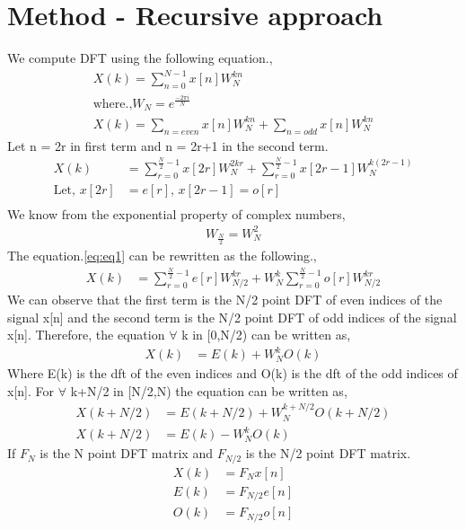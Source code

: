 \documentclass[journal,12pt,twocolumn]{IEEEtran}
\begin{document}
\section{Method - Recursive approach}
We compute DFT using the following equation.,
\begin{align}
    X(k) = \sum_{n=0}^{N-1}x[n]W_{N}^{kn} \label{eq:DFT_equation}\\
    \text{where.,} W_N = e^\frac{-2\pi i}{N}\\
    X(k) = \sum_{n=even}^{}x[n]W_{N}^{kn} + \sum_{n=odd}^{}x[n]W_{N}^{kn}
\end{align}
Let n = 2r in first term and n = 2r+1 in the second term.
\begin{align}
    X(k) &= \sum_{r=0}^{\frac{N}{2}-1}x[2r]W_{N}^{2kr} + \sum_{r=0}^{\frac{N}{2}-1}x[2r-1]W_{N}^{k(2r-1)} \label{eq:eq1}\\
\text{Let, }    x[2r]&=e[r] \text{, }x[2r-1]=o[r]\\
\end{align}
We know from the exponential property of complex numbers,
\begin{align}
    W_\frac{N}{2} = W_{N}^{2}
\end{align}
The equation.\ref{eq:eq1} can be rewritten as the following.,
\begin{align}
    X(k) &= \sum_{r=0}^{\frac{N}{2}-1}e[r]W_{N/2}^{kr} + W_{N}^k\sum_{r=0}^{\frac{N}{2}-1}o[r]W_{N/2}^{kr}
\end{align}
We can observe that the first term is the N/2 point DFT of even indices of the signal x[n] and the second term is the N/2 point DFT of odd indices of the signal x[n].
Therefore, the equation $\forall$ k in [0,N/2) can be written as, 
\begin{align}
    X(k) &= E(k) + W_{N}^k O(k)  \label{eq:eq2}
\end{align}
Where E(k) is the dft of the even indices and O(k) is the dft of the odd indices of x[n].
For $\forall$ k+N/2 in [N/2,N) the equation can be written as,
\begin{align}
    X(k+N/2) &= E(k+N/2) + W_{N}^{k+N/2} O(k+N/2)\\
    X(k+N/2) &= E(k) - W_N^k O(k) \label{eq:eq3}
\end{align}
If $F_N$ is the N point DFT matrix and $F_{N/2}$ is the N/2 point DFT matrix.
\begin{align}
    X(k) &= F_N x[n]\\
    E(k) &= F_{N/2} e[n]\\
    O(k) &= F_{N/2} o[n]
\end{align}
\end{document}

